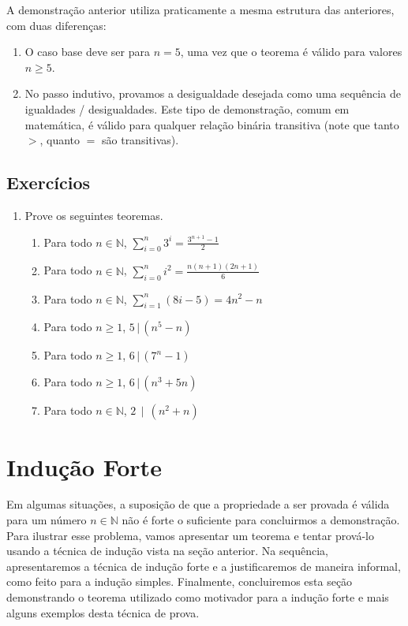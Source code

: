 \begin{Commentary}
A demonstração anterior utiliza praticamente a mesma estrutura das
anteriores, com duas diferenças:
\begin{enumerate}
  \item O caso base deve ser para $n = 5$, uma vez que o teorema é
    válido para valores $n \geq 5$.
  \item No passo indutivo, provamos a desigualdade desejada como uma
    sequência de igualdades / desigualdades. Este tipo de
    demonstração, comum em matemática, é válido para qualquer relação
    binária transitiva (note que tanto $>$, quanto $=$ são transitivas).
\end{enumerate}
\end{Commentary}

\subsection{Exercícios}

\begin{enumerate}
	\item Prove os seguintes teoremas.
	\begin{enumerate}
		\item Para todo $n\in\mathbb{N}$, $\sum_{i=0}^{n}3^i = \frac{3^{n + 1} - 1}{2}$
		\item Para todo $n\in\mathbb{N}$, $\sum_{i=0}^{n}i^{2} =
                  \frac{n(n+1)(2n + 1)}{6}$
                \item Para todo $n\in\mathbb{N}$, $\sum_{i=1}^{n}(8i - 5) =
                  4n^2 - n$
                \item Para todo $n\geq 1$, $5\,|\,(n^5-n)$
                \item Para todo $n\geq 1$, $6\,|\,(7^n-1)$
                \item Para todo $n\geq 1$, $6\,|\,(n^3+5n)$
		\item Para todo $n\in\mathbb{N}$, $2\,\mid\,(n^{2} + n)$
	\end{enumerate}
\end{enumerate}

\section{Indução Forte}

Em algumas situações, a suposição de que a propriedade a ser provada é
válida para um número $n \in \mathbb{N}$ não é forte o suficiente para
concluirmos a demonstração.  Para ilustrar esse problema, vamos
apresentar um teorema e tentar prová-lo usando a técnica de indução
vista na seção anterior. Na sequência, apresentaremos a técnica de indução forte
e a justificaremos de maneira informal, como feito para a indução
simples. Finalmente, concluiremos esta seção demonstrando o teorema
utilizado como motivador para a indução forte e mais alguns exemplos
desta técnica de prova.

